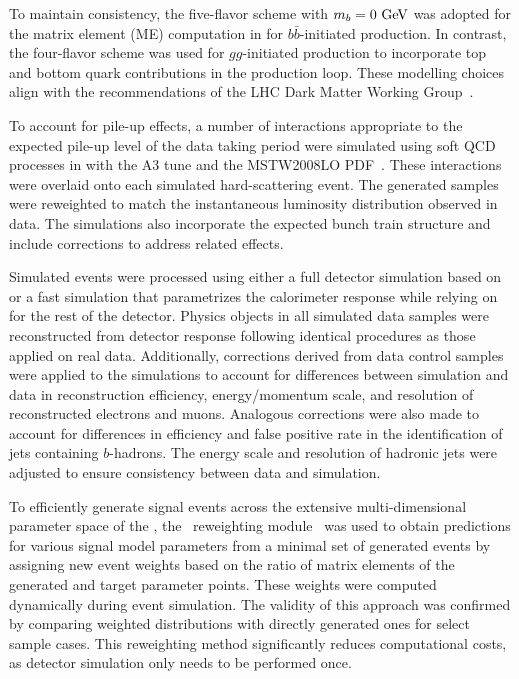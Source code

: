 To maintain consistency, the five-flavor scheme with $m_b = 0~\text{GeV}$ was adopted for the matrix element (ME) computation in \MGNLO for $b\bar{b}$-initiated production. 
In contrast, the four-flavor scheme was used for $gg$-initiated production to incorporate top and bottom quark contributions in the production loop. 
These modelling choices align with the recommendations of the LHC Dark Matter Working Group~\cite{2HDMWGproxi}.

To account for pile-up effects, a number of interactions appropriate to the expected pile-up level of the data taking period were simulated 
using soft QCD processes in  with the A3 tune\cite{ATL-PHYS-PUB-2012-003} and the MSTW2008LO PDF~\cite{Martin:2009iq}. 
These interactions were overlaid onto each simulated hard-scattering event. 
The generated samples were reweighted to match the instantaneous luminosity distribution observed in data. 
The simulations also incorporate the expected bunch train structure and include corrections to address related effects.

Simulated events were processed using either a full detector simulation based on \GEANT~\cite{Agostinelli:2002hh, SOFT-2010-01} 
or a fast simulation\cite{ATL-PHYS-PUB-2010-013} that parametrizes the calorimeter response while relying on \GEANT for the rest of the detector. 
Physics objects in all simulated data samples were reconstructed from detector response following identical procedures as those applied on real data. 
Additionally, corrections derived from data control samples were applied to the simulations to account for differences between simulation 
and data in reconstruction efficiency, energy/momentum scale, and resolution of reconstructed electrons and muons. 
Analogous corrections were also made to account for differences in efficiency and false positive rate in the identification of jets containing $b$-hadrons. 
The energy scale and resolution of hadronic jets were adjusted to ensure consistency between data and simulation.

To efficiently generate signal events across the extensive multi-dimensional parameter space of the \hdma, 
the \mg~reweighting module~\cite{Mattelaer:2016gcx} was used to obtain predictions for various signal model parameters from a 
minimal set of generated events by assigning new event weights based on the ratio of matrix elements of the generated and target parameter points. 
These weights were computed dynamically during event simulation. 
The validity of this approach was confirmed by comparing weighted distributions with directly generated ones for select sample cases. 
This reweighting method significantly reduces computational costs, as detector simulation only needs to be performed once.

